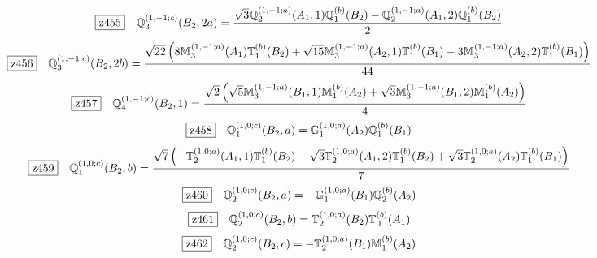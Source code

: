 \documentclass[fleqn,10pt,landscape]{jsarticle}
\begin{document}
\begin{dmath*}
\hspace*{3mm}\fbox{z455}\quad \mathbb{Q}_{3}^{(1,-1;c)}(B_{2},2a)=\frac{\sqrt{3} \mathbb{Q}_{2}^{(1,-1;a)}(A_{1},1) \mathbb{Q}_{1}^{(b)}(B_{2}) - \mathbb{Q}_{2}^{(1,-1;a)}(A_{1},2) \mathbb{Q}_{1}^{(b)}(B_{2})}{2}
\end{dmath*}
\begin{dmath*}
\hspace*{3mm}\fbox{z456}\quad \mathbb{Q}_{3}^{(1,-1;c)}(B_{2},2b)=\frac{\sqrt{22} \left(8 \mathbb{M}_{3}^{(1,-1;a)}(A_{1}) \mathbb{T}_{1}^{(b)}(B_{2}) + \sqrt{15} \mathbb{M}_{3}^{(1,-1;a)}(A_{2},1) \mathbb{T}_{1}^{(b)}(B_{1}) - 3 \mathbb{M}_{3}^{(1,-1;a)}(A_{2},2) \mathbb{T}_{1}^{(b)}(B_{1})\right)}{44}
\end{dmath*}
\begin{dmath*}
\hspace*{3mm}\fbox{z457}\quad \mathbb{Q}_{4}^{(1,-1;c)}(B_{2},1)=\frac{\sqrt{2} \left(\sqrt{5} \mathbb{M}_{3}^{(1,-1;a)}(B_{1},1) \mathbb{M}_{1}^{(b)}(A_{2}) + \sqrt{3} \mathbb{M}_{3}^{(1,-1;a)}(B_{1},2) \mathbb{M}_{1}^{(b)}(A_{2})\right)}{4}
\end{dmath*}
\begin{dmath*}
\hspace*{3mm}\fbox{z458}\quad \mathbb{Q}_{1}^{(1,0;c)}(B_{2},a)=\mathbb{G}_{1}^{(1,0;a)}(A_{2}) \mathbb{Q}_{1}^{(b)}(B_{1})
\end{dmath*}
\begin{dmath*}
\hspace*{3mm}\fbox{z459}\quad \mathbb{Q}_{1}^{(1,0;c)}(B_{2},b)=\frac{\sqrt{7} \left(- \mathbb{T}_{2}^{(1,0;a)}(A_{1},1) \mathbb{T}_{1}^{(b)}(B_{2}) - \sqrt{3} \mathbb{T}_{2}^{(1,0;a)}(A_{1},2) \mathbb{T}_{1}^{(b)}(B_{2}) + \sqrt{3} \mathbb{T}_{2}^{(1,0;a)}(A_{2}) \mathbb{T}_{1}^{(b)}(B_{1})\right)}{7}
\end{dmath*}
\begin{dmath*}
\hspace*{3mm}\fbox{z460}\quad \mathbb{Q}_{2}^{(1,0;c)}(B_{2},a)=- \mathbb{G}_{1}^{(1,0;a)}(B_{1}) \mathbb{Q}_{2}^{(b)}(A_{2})
\end{dmath*}
\begin{dmath*}
\hspace*{3mm}\fbox{z461}\quad \mathbb{Q}_{2}^{(1,0;c)}(B_{2},b)=\mathbb{T}_{2}^{(1,0;a)}(B_{2}) \mathbb{T}_{0}^{(b)}(A_{1})
\end{dmath*}
\begin{dmath*}
\hspace*{3mm}\fbox{z462}\quad \mathbb{Q}_{2}^{(1,0;c)}(B_{2},c)=- \mathbb{T}_{2}^{(1,0;a)}(B_{1}) \mathbb{M}_{1}^{(b)}(A_{2})
\end{dmath*}
\end{document}
